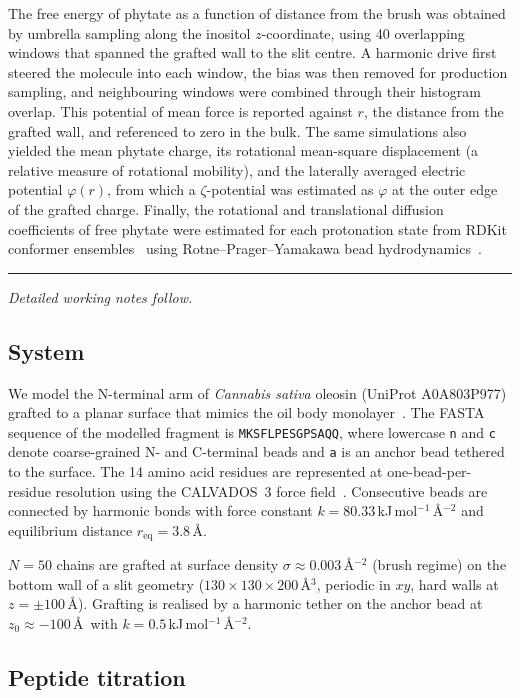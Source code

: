 \documentclass[11pt]{article}
\begin{document}
The free energy of phytate as a function of distance from the brush was
obtained by umbrella sampling along the inositol $z$-coordinate, using 40
overlapping windows that spanned the grafted wall to the slit centre.  A
harmonic drive first steered the molecule into each window, the bias was
then removed for production sampling, and neighbouring windows were combined
through their histogram overlap.  This potential of mean force is reported
against $r$, the distance from the grafted wall, and referenced to zero in
the bulk.  The same simulations also yielded the mean phytate charge, its
rotational mean-square displacement (a relative measure of rotational
mobility), and the laterally averaged electric potential $\varphi(r)$, from
which a $\zeta$-potential was estimated as $\varphi$ at the outer edge of the
grafted charge.  Finally, the rotational and translational diffusion
coefficients of free phytate were estimated for each protonation state from
RDKit conformer ensembles~\cite{RDKit} using Rotne--Prager--Yamakawa bead
hydrodynamics~\cite{Zuk2018,Waszkiewicz2023}.

\bigskip
\hrule
\bigskip
\noindent\textit{Detailed working notes follow.}

\subsection{System}

We model the N-terminal arm of \textit{Cannabis sativa} oleosin
(UniProt A0A803P977) grafted to a planar surface that mimics the oil
body monolayer~\cite{Tzen1992}.  The FASTA sequence of the modelled
fragment is \texttt{MKSFLPESGPSAQQ}, where lowercase \texttt{n}
and \texttt{c} denote coarse-grained N- and C-terminal beads and
\texttt{a} is an anchor bead tethered to the surface.
The 14 amino acid residues are represented at one-bead-per-residue
resolution using the CALVADOS~3 force field~\cite{Tesei2021,Cao2024}.
Consecutive beads are connected by harmonic bonds with force constant
$k = 80.33$\,kJ\,mol$^{-1}$\,\AA$^{-2}$ and equilibrium distance
$r_\text{eq} = 3.8$\,\AA.

$N = 50$ chains are grafted at surface density
$\sigma \approx 0.003$\,\AA$^{-2}$ (brush regime) on the bottom wall
of a slit geometry ($130 \times 130 \times 200$\,\AA$^{3}$, periodic
in $xy$, hard walls at $z = \pm 100$\,\AA).  Grafting is realised by
a harmonic tether on the anchor bead at $z_0 \approx -100$\,\AA\ with
$k = 0.5$\,kJ\,mol$^{-1}$\,\AA$^{-2}$.

\subsection{Peptide titration}\label{sec:peptitration}
\end{document}
